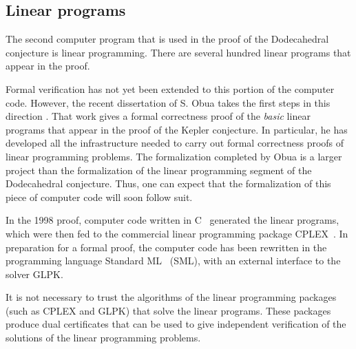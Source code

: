 \documentclass{article} %
\begin{document}

\subsection{Linear programs}

The second computer program that is used in the proof of the
Dodecahedral conjecture is linear programming. There are several
hundred linear programs that appear in the proof.

Formal verification has not yet been extended to this portion of the
computer code. However, the recent dissertation of S. Obua takes the
first steps in this direction \cite{Obua:2008:Thesis}. That work gives
a formal correctness proof of the {\it basic} linear programs that
appear in the proof of the Kepler conjecture. In particular, he has
developed all the infrastructure needed to carry out formal
correctness proofs of linear programming problems. The formalization
completed by Obua is a larger project than the formalization of the
linear programming segment of the Dodecahedral conjecture. Thus, one
can expect that the formalization of this piece of computer code will
soon follow suit.

In the 1998 proof, computer code written in C~\cite{Kernighan:1978:C}
generated the linear programs, which were then fed to the commercial
linear programming package CPLEX~\cite{website:Cplex}. In preparation for a
formal proof, the computer code has been rewritten in the programming
language Standard ML~\cite{Milner:1990:SML} (SML), with an external
interface to the solver GLPK\cite{website:GLPK}.

It is not necessary to trust the algorithms of the
linear programming packages (such as CPLEX and GLPK) that solve
the linear programs.  These packages produce dual certificates that
can be used to give independent verification of the solutions
of the linear programming problems.
\end{document}
